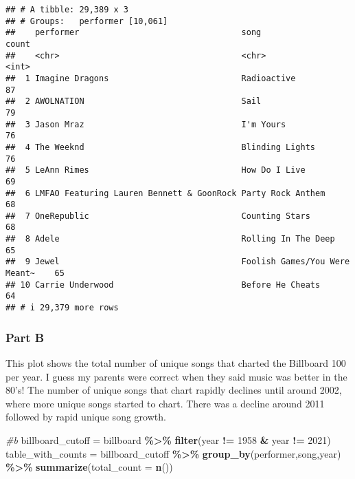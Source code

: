 \documentclass[
]{article}
\newenvironment{Shaded}{\begin{snugshade}}{\end{snugshade}}
\newcommand{\AttributeTok}[1]{\textcolor[rgb]{0.13,0.29,0.53}{#1}}
\newcommand{\CommentTok}[1]{\textcolor[rgb]{0.56,0.35,0.01}{\textit{#1}}}
\newcommand{\DecValTok}[1]{\textcolor[rgb]{0.00,0.00,0.81}{#1}}
\newcommand{\FunctionTok}[1]{\textcolor[rgb]{0.13,0.29,0.53}{\textbf{#1}}}
\newcommand{\NormalTok}[1]{#1}
\newcommand{\OtherTok}[1]{\textcolor[rgb]{0.56,0.35,0.01}{#1}}
\newcommand{\SpecialCharTok}[1]{\textcolor[rgb]{0.81,0.36,0.00}{\textbf{#1}}}
\begin{document}
\begin{verbatim}
## # A tibble: 29,389 x 3
## # Groups:   performer [10,061]
##    performer                                 song                          count
##    <chr>                                     <chr>                         <int>
##  1 Imagine Dragons                           Radioactive                      87
##  2 AWOLNATION                                Sail                             79
##  3 Jason Mraz                                I'm Yours                        76
##  4 The Weeknd                                Blinding Lights                  76
##  5 LeAnn Rimes                               How Do I Live                    69
##  6 LMFAO Featuring Lauren Bennett & GoonRock Party Rock Anthem                68
##  7 OneRepublic                               Counting Stars                   68
##  8 Adele                                     Rolling In The Deep              65
##  9 Jewel                                     Foolish Games/You Were Meant~    65
## 10 Carrie Underwood                          Before He Cheats                 64
## # i 29,379 more rows
\end{verbatim}

\subsubsection{Part B}\label{part-b-1}

This plot shows the total number of unique songs that charted the
Billboard 100 per year. I guess my parents were correct when they said
music was better in the 80's! The number of unique songs that chart
rapidly declines until around 2002, where more unique songs started to
chart. There was a decline around 2011 followed by rapid unique song
growth.

\begin{Shaded}
\begin{Highlighting}[]
\CommentTok{\#b}
\NormalTok{billboard\_cutoff }\OtherTok{=}\NormalTok{ billboard }\SpecialCharTok{\%\textgreater{}\%} \FunctionTok{filter}\NormalTok{(year }\SpecialCharTok{!=} \DecValTok{1958} \SpecialCharTok{\&}\NormalTok{ year }\SpecialCharTok{!=} \DecValTok{2021}\NormalTok{)}
\NormalTok{table\_with\_counts }\OtherTok{=}\NormalTok{ billboard\_cutoff }\SpecialCharTok{\%\textgreater{}\%} \FunctionTok{group\_by}\NormalTok{(performer,song,year) }\SpecialCharTok{\%\textgreater{}\%} 
  \FunctionTok{summarize}\NormalTok{(}\AttributeTok{total\_count =} \FunctionTok{n}\NormalTok{())}
\end{Highlighting}
\end{Shaded}
\end{document}
